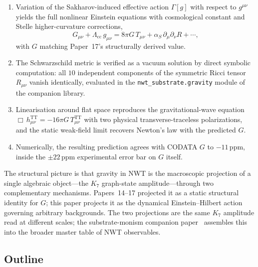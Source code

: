 \documentclass[11pt]{article}
\begin{document}
\begin{enumerate}
      is logged as a follow-up.
\item Variation of the Sakharov-induced effective action $\Gamma[g]$
      with respect to $g^{\mu\nu}$ yields the full nonlinear
      Einstein equations with cosmological constant and Stelle
      higher-curvature corrections,
      \begin{equation}
        G_{\mu\nu} + \Lambda_{\mathrm{cc}}\,g_{\mu\nu}
        = 8\pi G\,T_{\mu\nu}
        + \alpha_S\,\partial_\mu\partial_\nu R + \cdots,
      \end{equation}
      with $G$ matching Paper~17's structurally derived value.
\item The Schwarzschild metric is verified as a vacuum solution by
      direct symbolic computation: all $10$ independent components
      of the symmetric Ricci tensor $R_{\mu\nu}$ vanish identically,
      evaluated in the \texttt{nwt\_substrate.gravity} module of
      the companion library.
\item Linearisation around flat space reproduces the
      gravitational-wave equation
      $\Box\,h^{\mathrm{TT}}_{\mu\nu} = -16\pi G\,T^{\mathrm{TT}}_{\mu\nu}$
      with two physical transverse-traceless polarizations, and
      the static weak-field limit recovers Newton's law with the
      predicted $G$.
\item Numerically, the resulting prediction agrees with CODATA $G$
      to $-11$\,ppm, inside the $\pm 22$\,ppm experimental error
      bar on $G$ itself.
\end{enumerate}

The structural picture is that gravity in NWT is the macroscopic
projection of a single algebraic object---the $K_7$ graph-state
amplitude---through two complementary mechanisms.  Papers~14--17
projected it as a static structural identity for $G$;
this paper projects it as the dynamical Einstein--Hilbert action
governing arbitrary backgrounds.  The two projections are the same
$K_7$ amplitude read at different scales; the substrate-monism
companion paper~\cite{paper19} assembles this into the broader
master table of NWT observables.

\subsection{Outline}
\end{document}
